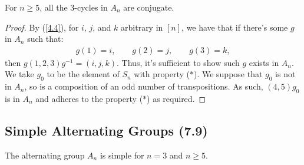 For $n \geq 5$, all the 3-cycles in $A_n$ are conjugate.

\begin{proof}
    By (\ref{4.4}), for $i$, $j$, and $k$ arbitrary in
    $[n]$, we have that if there's some $g$ in
    $A_n$ such that: \begin{align*}
        g(1) = i, 
        \qquad g(2) = j, 
        \qquad g(3) = k, \tag{$\ast$}
    \end{align*} then $g(1, 2, 3)g^{-1} = (i, j, k)$.
    Thus, it's sufficient to show such $g$ exists in $A_n$.
    We take $g_0$ to be the element of $S_n$ with property
    ($\ast$). We suppose that $g_0$ is not in $A_n$,
    so is a composition of an odd number of transpositions.
    As such, $(4, 5)g_0$ is in $A_n$ and adheres to the
    property ($\ast$) as required.
\end{proof}

\subsection{Simple Alternating Groups (7.9)} \label{7.9}

The alternating group $A_n$ is simple for $n = 3$ and $n \geq 5$.


